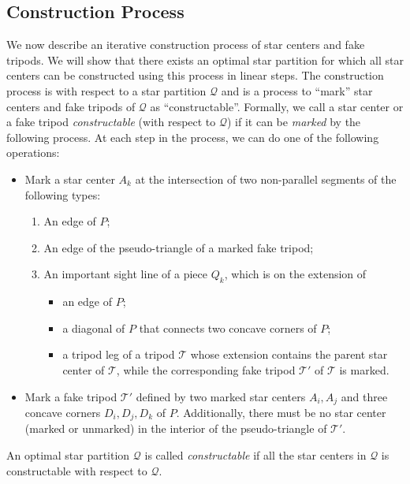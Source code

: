 \documentclass{theoretics}
\begin{document}
\subsection{Construction Process}\label{sec:constproc}
We now describe an iterative construction process of star centers and fake tripods. 
We will show that there exists an optimal star partition for which all star centers can be constructed using this process in linear steps. 
The construction process is with respect to a star partition $\mathcal{Q}$ and is a process to ``mark'' star centers and fake tripods of $\mathcal{Q}$ as ``constructable''. 
Formally, we call a star center or a fake tripod \emph{constructable} (with respect to $\mathcal{Q}$) if it can be \emph{marked} by the following process. 
At each step in the process, we can do one of the following operations:
\begin{itemize}
    \item Mark a star center $A_k$ at the intersection of two non-parallel segments of the following types:
    \begin{enumerate}
        \item An edge of $P$; 
        \item An edge of the pseudo-triangle of a marked fake tripod; 
        \item An important sight line of a piece $Q_k$, which is on the extension of 
        \begin{itemize}
            \item an edge of $P$; 
            \item a diagonal of $P$ that connects two concave corners of $P$; 
            \item a tripod leg of a tripod $\mathcal{T}$ whose extension contains the parent star center of $\mathcal{T}$, while the corresponding fake tripod $\mathcal{T}'$ of $\mathcal{T}$ is marked. 
        \end{itemize}
    \end{enumerate}
    \item Mark a fake tripod $\mathcal{T}'$ defined by two marked star centers $A_i, A_j$ and three concave corners $D_i, D_j, D_k$ of $P$. 
    Additionally, there must be no star center (marked or unmarked) in the interior of the pseudo-triangle of $\mathcal{T}'$. 
\end{itemize}
An optimal star partition $\mathcal{Q}$ is called \emph{constructable} if all the star centers in $\mathcal{Q}$ is constructable with respect to $\mathcal{Q}$. 
\end{document}
